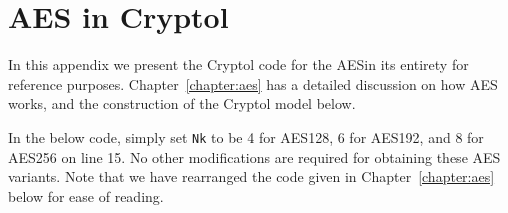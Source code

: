\chapter{AES in Cryptol}\label{app:aes}

In this appendix we present the Cryptol code for the AES\indAES in its
entirety for reference purposes.  Chapter~\ref{chapter:aes} has a
detailed discussion on how AES works, and the construction of the
Cryptol model below.

In the below code, simply set {\tt Nk} to be 4 for AES128, 6 for
AES192, and 8 for AES256 on line 15. No other modifications are
required for obtaining these AES variants. Note that we have
rearranged the code given in Chapter~\ref{chapter:aes} below for ease
of reading.


